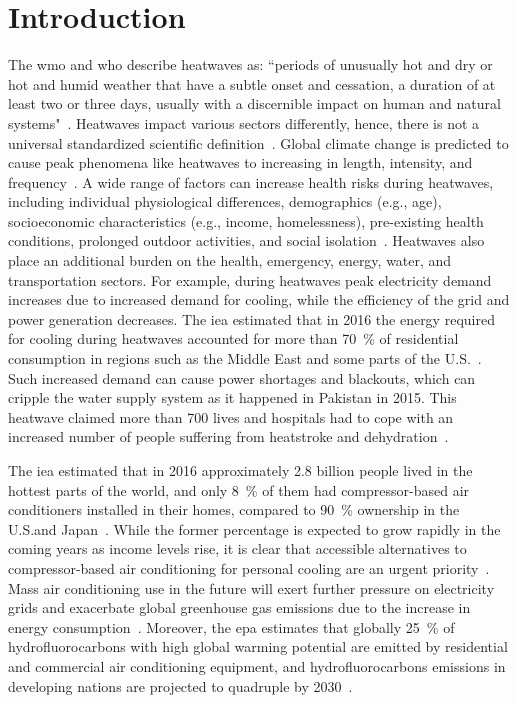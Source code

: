 
\section{Introduction}\label{sec:introduction}

The \ac{wmo} and \ac{who} describe heatwaves as: ``periods of unusually hot and dry or hot and humid weather that have a subtle onset and cessation, a duration of at least two or three days, usually with a discernible impact on human and natural systems"~\cite{WMO2015}.
Heatwaves impact various sectors differently, hence, there is not a universal standardized scientific definition~\cite{Perkins2013}.
Global climate change is predicted to cause peak phenomena like heatwaves to increasing in length, intensity, and frequency~\cite{Whatharm75:online}.
A wide range of factors can increase health risks during heatwaves, including individual physiological differences, demographics (e.g., age), socioeconomic characteristics (e.g., income, homelessness), pre-existing health conditions, prolonged outdoor activities, and social isolation~\cite{WMO2015}.
Heatwaves also place an additional burden on the health, emergency, energy, water, and transportation sectors. 
For example, during heatwaves peak electricity demand increases due to increased demand for cooling, while the efficiency of the grid and power generation decreases.
The \ac{iea} estimated that in 2016 the energy required for cooling during heatwaves accounted for more than 70~\% of residential consumption in regions such as the Middle East and some parts of the U.S.~\cite{IEA2018}.
Such increased demand can cause power shortages and blackouts, which can cripple the water supply system as it happened in Pakistan in 2015.
This heatwave claimed more than 700 lives and hospitals had to cope with an increased number of people suffering from heatstroke and dehydration~\cite{Masood2015}.

The \ac{iea} estimated that in 2016 approximately 2.8 billion people lived in the hottest parts of the world, and only 8~\% of them had compressor-based air conditioners installed in their homes, compared to 90~\% ownership in the U.S.\@ and Japan~\cite{IEA2018}.
While the former percentage is expected to grow rapidly in the coming years as income levels rise, it is clear that accessible alternatives to compressor-based air conditioning for personal cooling are an urgent priority~\cite{Davis2015}.
Mass air conditioning use in the future will exert further pressure on electricity grids and exacerbate global greenhouse gas emissions due to the increase in energy consumption~\cite{IEA2018}.
Moreover, the \ac{epa} estimates that globally 25~\% of hydrofluorocarbons with high global warming potential are emitted by residential and commercial air conditioning equipment, and hydrofluorocarbons emissions in developing nations are projected to quadruple by 2030~\cite{Snap2016}.

